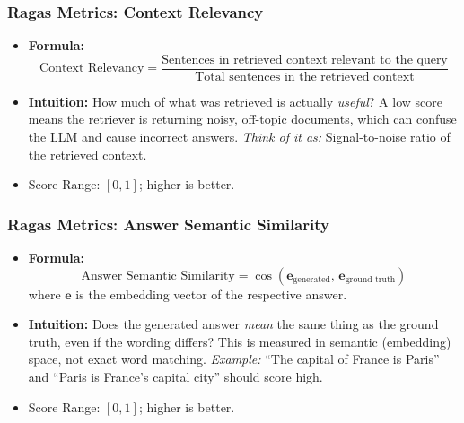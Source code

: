 \begin{frame}[fragile]
\frametitle{Ragas Metrics: Context Relevancy}
\begin{itemize}
    \item \textbf{Formula:}
    \[
      \text{Context Relevancy} = \frac{\text{Sentences in retrieved context relevant to the query}}{\text{Total sentences in the retrieved context}}
    \]
    \item \textbf{Intuition:} How much of what was retrieved is actually \textit{useful}? A low score means the retriever is returning noisy, off-topic documents, which can confuse the LLM and cause incorrect answers.
    \newline \textit{Think of it as:} Signal-to-noise ratio of the retrieved context.
    \item Score Range: $[0, 1]$; higher is better.
\end{itemize}
\end{frame}

\begin{frame}[fragile]
\frametitle{Ragas Metrics: Answer Semantic Similarity}
\begin{itemize}
    \item \textbf{Formula:}
    \[
      \text{Answer Semantic Similarity} = \cos(\mathbf{e}_{\text{generated}},\, \mathbf{e}_{\text{ground truth}})
    \]
    where $\mathbf{e}$ is the embedding vector of the respective answer.
    \item \textbf{Intuition:} Does the generated answer \textit{mean} the same thing as the ground truth, even if the wording differs? This is measured in semantic (embedding) space, not exact word matching.
    \newline \textit{Example:} ``The capital of France is Paris'' and ``Paris is France's capital city'' should score high.
    \item Score Range: $[0, 1]$; higher is better.
\end{itemize}
\end{frame}


